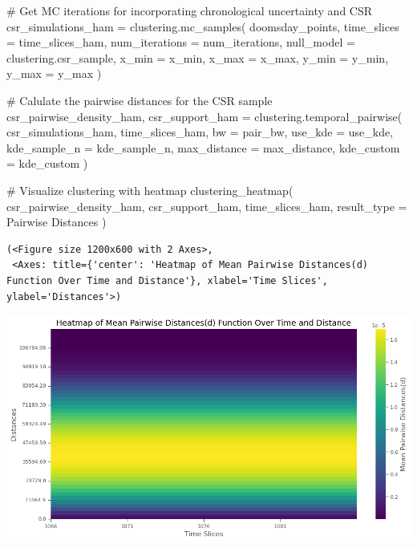 \documentclass[
  11pt,
  letterpaper,
  DIV=11,
  numbers=noendperiod]{scrartcl}
\newenvironment{Shaded}{\begin{snugshade}}{\end{snugshade}}
\newcommand{\CommentTok}[1]{\textcolor[rgb]{0.37,0.37,0.37}{#1}}
\newcommand{\NormalTok}[1]{\textcolor[rgb]{0.00,0.23,0.31}{#1}}
\newcommand{\OperatorTok}[1]{\textcolor[rgb]{0.37,0.37,0.37}{#1}}
\newcommand{\StringTok}[1]{\textcolor[rgb]{0.13,0.47,0.30}{#1}}
\begin{document}
\begin{Shaded}
\begin{Highlighting}[]
\CommentTok{\# Get MC iterations for incorporating chronological uncertainty and CSR}
\NormalTok{csr\_simulations\_ham }\OperatorTok{=}\NormalTok{ clustering.mc\_samples(}
\NormalTok{    doomsday\_points, }
\NormalTok{    time\_slices }\OperatorTok{=}\NormalTok{ time\_slices\_ham,  }
\NormalTok{    num\_iterations }\OperatorTok{=}\NormalTok{ num\_iterations,}
\NormalTok{    null\_model }\OperatorTok{=}\NormalTok{ clustering.csr\_sample,}
\NormalTok{    x\_min }\OperatorTok{=}\NormalTok{ x\_min, }
\NormalTok{    x\_max }\OperatorTok{=}\NormalTok{ x\_max,}
\NormalTok{    y\_min }\OperatorTok{=}\NormalTok{ y\_min, }
\NormalTok{    y\_max }\OperatorTok{=}\NormalTok{ y\_max}
\NormalTok{)}

\CommentTok{\# Calulate the pairwise distances for the CSR sample}
\NormalTok{csr\_pairwise\_density\_ham, csr\_support\_ham }\OperatorTok{=}\NormalTok{ clustering.temporal\_pairwise(}
\NormalTok{    csr\_simulations\_ham, }
\NormalTok{    time\_slices\_ham, }
\NormalTok{    bw }\OperatorTok{=}\NormalTok{ pair\_bw, }
\NormalTok{    use\_kde }\OperatorTok{=}\NormalTok{ use\_kde,}
\NormalTok{    kde\_sample\_n }\OperatorTok{=}\NormalTok{ kde\_sample\_n, }
\NormalTok{    max\_distance }\OperatorTok{=}\NormalTok{ max\_distance,}
\NormalTok{    kde\_custom }\OperatorTok{=}\NormalTok{ kde\_custom}
\NormalTok{)}

\CommentTok{\# Visualize clustering with heatmap}
\NormalTok{clustering\_heatmap(}
\NormalTok{    csr\_pairwise\_density\_ham,}
\NormalTok{    csr\_support\_ham,}
\NormalTok{    time\_slices\_ham,}
\NormalTok{    result\_type }\OperatorTok{=} \StringTok{\textquotesingle{}Pairwise Distances\textquotesingle{}}
\NormalTok{)}
\end{Highlighting}
\end{Shaded}

\begin{verbatim}
(<Figure size 1200x600 with 2 Axes>,
 <Axes: title={'center': 'Heatmap of Mean Pairwise Distances(d) Function Over Time and Distance'}, xlabel='Time Slices', ylabel='Distances'>)
\end{verbatim}

\includegraphics{analysis_files/figure-pdf/cell-28-output-2.png}
\end{document}
